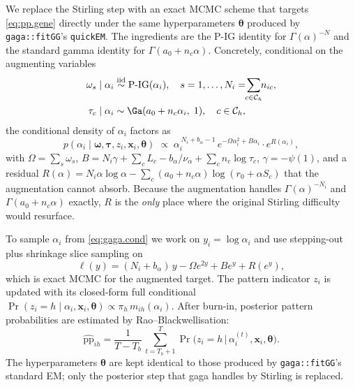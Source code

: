 We replace the Stirling step with an exact MCMC scheme that targets
\eqref{eq:pp.gene} directly under the same hyperparameters
$\boldsymbol\theta$ produced by \texttt{gaga::fitGG}'s \texttt{quickEM}.
The ingredients are the P-IG identity for $\Gamma(\alpha)^{-N}$
\citep[Theorem~\ref{thm:main}]{} and the standard gamma identity for
$\Gamma(a_0 + n_c \alpha)$. Concretely, conditional on the augmenting
variables
\begin{equation}\label{eq:gaga.aug}
\begin{aligned}
\omega_s \mid \alpha_i &\stackrel{\mathrm{iid}}{\sim} \mathrm{P\text{-}IG}(\alpha_i),
   \quad s = 1, \dots, N_i = \!\!\sum_{c \in \mathcal{C}_h}\!\! n_{ic},\\
\tau_c \mid \alpha_i &\sim \Ga(a_0 + n_c \alpha_i,\; 1), \quad c \in \mathcal{C}_h,
\end{aligned}
\end{equation}
the conditional density of $\alpha_i$ factors as
\begin{equation}\label{eq:gaga.cond}
p(\alpha_i \mid \boldsymbol\omega, \boldsymbol\tau, z_i, \mathbf{x}_i, \boldsymbol\theta)
\;\propto\; \alpha_i^{\,N_i + b_\alpha - 1}\, e^{-\Omega \alpha_i^2 + B \alpha_i}
\cdot e^{R(\alpha_i)},
\end{equation}
with $\Omega = \sum_s \omega_s$,
$B = N_i\gamma + \sum_c L_c - b_\alpha/\nu_\alpha + \sum_c n_c \log \tau_c$,
$\gamma = -\psi(1)$, and a residual
$R(\alpha) = N_i \alpha \log \alpha - \sum_c (a_0 + n_c \alpha) \log(r_0 + \alpha S_c)$
that the augmentation cannot absorb. Because the augmentation handles
$\Gamma(\alpha)^{-N_i}$ and $\Gamma(a_0 + n_c \alpha)$ exactly, $R$ is the
\emph{only} place where the original Stirling difficulty would resurface.

To sample $\alpha_i$ from \eqref{eq:gaga.cond} we work on
$y_i = \log\alpha_i$ and use stepping-out plus shrinkage slice sampling
\citep{Neal2003slice} on
\begin{equation}\label{eq:gaga.ell}
\ell(y) = (N_i + b_\alpha)\,y - \Omega e^{2y} + B e^y + R(e^y),
\end{equation}
which is exact MCMC for the augmented target. The pattern indicator $z_i$
is updated with its closed-form full conditional
$\Pr(z_i = h \mid \alpha_i, \mathbf{x}_i, \boldsymbol\theta)
   \propto \pi_h\, m_{ih}(\alpha_i)$. After burn-in, posterior pattern
probabilities are estimated by Rao--Blackwellisation:
\begin{equation}\label{eq:rb.pp}
\widehat{\mathrm{pp}}_{ih} = \frac{1}{T - T_b}\,
   \sum_{t = T_b+1}^T \Pr\!\bigl(z_i = h \,\big|\, \alpha_i^{(t)}, \mathbf{x}_i, \boldsymbol\theta\bigr).
\end{equation}
The hyperparameters $\boldsymbol\theta$ are kept identical to those
produced by \texttt{gaga::fitGG}'s standard EM; only the posterior step
that gaga handles by Stirling is replaced.

